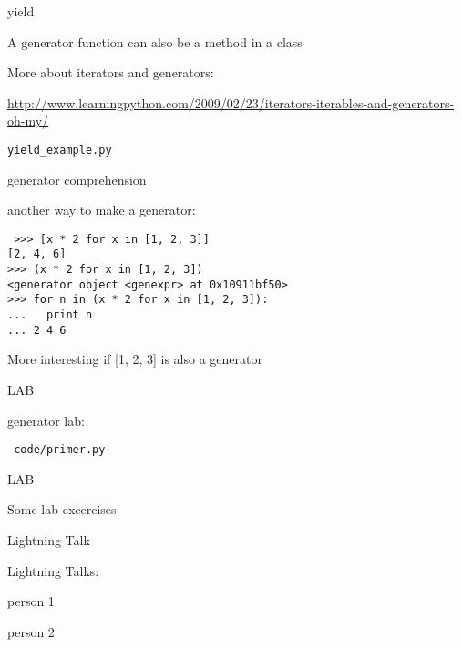\documentclass{beamer}
\begin{document}
\begin{frame}[fragile]{yield}

{\Large A generator function can also be a method in a class}

\vfill
{\Large More about iterators and generators:}

\vfill
\url{http://www.learningpython.com/2009/02/23/iterators-iterables-and-generators-oh-my/}

\vfill
\verb|yield_example.py|
\end{frame}

\begin{frame}[fragile]{generator comprehension}

{\Large another way to make a generator:}

\begin{verbatim}
￼>>> [x * 2 for x in [1, 2, 3]]
[2, 4, 6]
>>> (x * 2 for x in [1, 2, 3])
<generator object <genexpr> at 0x10911bf50>
>>> for n in (x * 2 for x in [1, 2, 3]):
...   print n
... 2 4 6
\end{verbatim}

\vfill
More interesting if [1, 2, 3] is also a generator

\end{frame}


\begin{frame}[fragile]{LAB}

\vfill
{\LARGE generator lab:}

\vfill
{\LARGE \verb| code/primer.py |}
\vfill

\end{frame}



\begin{frame}{LAB}

\vfill
{\large Some lab excercises}
\vfill

\end{frame}


\begin{frame}{Lightning Talk}

{\LARGE Lightning Talks:}

\vfill
{\large person 1}

\vfill
{\large person 2}

\end{frame}
\end{document}
